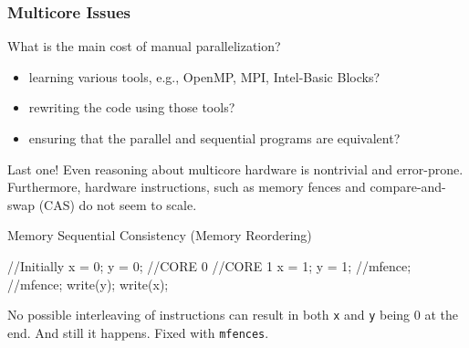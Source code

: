 \documentclass{beamer}
\newcommand{\emp}[1]{\textcolor{DikuRed}{ #1}}
\begin{document}
\begin{frame}[fragile,t]
  \frametitle{Multicore Issues} 

What is the main cost of manual parallelization?\\
\begin{itemize}
    \item learning various tools, e.g., OpenMP, MPI, Intel-Basic Blocks?
    \item rewriting the code using those tools?
    \item ensuring that the parallel and sequential programs are equivalent?
\end{itemize}

\pause
\smallskip

Last one! Even reasoning about multicore hardware is nontrivial and error-prone.
Furthermore, \emp{hardware instructions, such as memory fences and 
compare-and-swap (CAS) do not seem to scale.}


\smallskip


\begin{block}{Memory Sequential Consistency (Memory Reordering)}
\begin{colorcode}[fontsize=\small]
         //Initially x = 0; y = 0;
//CORE 0                           //CORE 1
x = 1;                             y = 1;
//mfence;                          //mfence;
write(y);                          write(x);
\end{colorcode}
\end{block} 



\pause

No possible interleaving of instructions can result in both {\tt x} and {\tt y} 
being $0$ at the end. And still it happens. Fixed with {\tt mfences}.


\end{frame}
\end{document}
